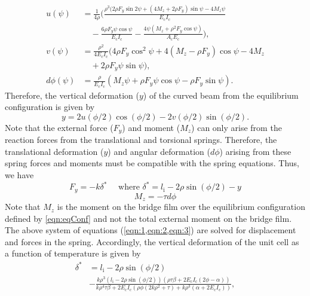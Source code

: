 \documentclass[final,times,5p]{elsarticle}
\numberwithin{equation}{section}
\begin{document}
\begin{align}
    u(\psi)&=\frac{1}{4 \rho}\bigg(\frac{\rho^3(2  \rho F_y \sin{2\psi}+(4 M_z + 2  \rho F_y)\sin{\psi}-4 M_z \psi}{E_\mathrm{c} I_\mathrm{c}} \nonumber \\
    &\quad-\frac{6 \rho F_y \psi\cos{\psi}}{E_\mathrm{c} I_\mathrm{c}} - \frac{4\psi(M_z+\rho^2 F_y \cos{\psi})}{A_\mathrm{c} E_\mathrm{c}}\bigg),\\
    v(\psi)&=\frac{\rho^2}{4 E_\mathrm{c} I_\mathrm{c}}\bigg(4 \rho F_y \cos^2{\psi}+4(M_z-\rho F_y)\cos{\psi}-4 M_z \nonumber \\
    &\quad+2 \rho F_y \psi \sin{\psi}\bigg),\\
    d\phi(\psi)&=\frac{\rho}{E_\mathrm{c} I_\mathrm{c}}(M_z \psi + \rho F_y \psi \cos{\psi} - \rho F_y \sin{\psi}).
\end{align}
%
Therefore, the vertical deformation ($y$) of the curved beam from the equilibrium configuration is given by
\begin{equation} \label{eqn:1}
    y=2 u(\phi/2) \cos{(\phi/2)} - 2 v(\phi/2) \sin{(\phi/2)}.
\end{equation}
%
Note that the external force ($F_y$) and moment ($M_z$) can only arise from the reaction forces from the translational and torsional springs. Therefore, the translational deformation ($y$) and angular deformation ($d\phi$) arising from these spring forces and moments must be compatible with the spring equations. Thus, we have
\begin{equation} \label{eqn:2}
    F_y=-k \delta^* \quad \text{ where } \delta^*=l_\mathrm{i}-2 \rho \sin(\phi/2)-y
\end{equation}
\begin{equation} \label{eqn:3}
    M_z=-\tau d\phi
\end{equation}
%
Note that $M_z$ is the moment on the bridge film over the equilibrium configuration defined by \cref{eqn:eqConf} and not the total external moment on the bridge film. The above system of equations (\cref{eqn:1,eqn:2,eqn:3}) are solved for displacement and forces in the spring. Accordingly, the vertical deformation of the unit cell as a function of temperature is given by  
\begin{align}
    \delta^*&=l_\mathrm{i}-2 \rho \sin(\phi/2)\nonumber\\
    & -\frac{k \rho^3 (l_\mathrm{i}-2 \rho \sin(\phi/2)) (\rho \tau \beta + 2 E_\mathrm{c}I_\mathrm{c} (2 \phi - \alpha))}{k \rho^4 \tau \beta + 2 E_\mathrm{c}I_\mathrm{c}(\rho \phi(2 k \rho^2+\tau)+ k \rho^3(\alpha+2 E_\mathrm{c}I_\mathrm{c}))},
\end{align}
\end{document}

